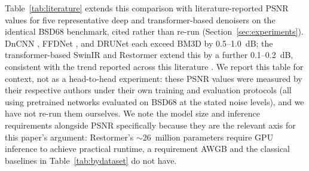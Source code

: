 \documentclass[final,3p,times,twocolumn,nopreprintline]{elsarticle}
\begin{document}
Table~\ref{tab:literature} extends this comparison with literature-reported PSNR values for five representative deep and transformer-based denoisers on the identical BSD68 benchmark, cited rather than re-run (Section~\ref{sec:experiments}). DnCNN \cite{zhang2017beyond}, FFDNet \cite{zhang2018ffdnet}, and DRUNet \cite{zhang2021plug} each exceed BM3D by 0.5--1.0~dB; the transformer-based SwinIR \cite{liang2021swinir} and Restormer \cite{zamir2022restormer} extend this by a further 0.1--0.2~dB, consistent with the trend reported across this literature \cite{zhang2024xformer}. We report this table for context, not as a head-to-head experiment: these PSNR values were measured by their respective authors under their own training and evaluation protocols (all using pretrained networks evaluated on BSD68 at the stated noise levels), and we have not re-run them ourselves. We note the model size and inference requirements alongside PSNR specifically because they are the relevant axis for this paper's argument: Restormer's $\sim$26~million parameters \cite{zamir2022restormer} require GPU inference to achieve practical runtime, a requirement AWGB and the classical baselines in Table~\ref{tab:bydataset} do not have.

\begin{table}[t]
\centering
\caption{Literature-reported PSNR (dB) on BSD68, cited (not re-run). AWGB row uses our own measurements for direct positioning.}
\label{tab:literature}
\end{table}
\end{document}

